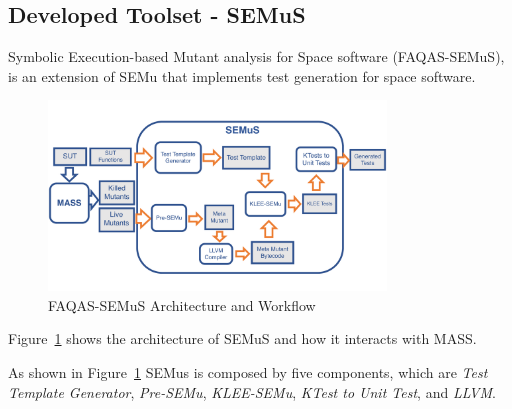 
\newpage
\subsection{Developed Toolset - SEMuS}
\label{sec:semus}

\STARTCHANGEDWPT

Symbolic Execution-based Mutant analysis for Space software (FAQAS-SEMuS), is an extension of SEMu that implements test generation for space software. 


\begin{figure}[tb]
\begin{center}
\includegraphics[width=0.8\textwidth]{images/semus-architecture}
\caption{FAQAS-SEMuS Architecture and Workflow}
\label{fig:semus_architecture}
\end{center}
\end{figure}

Figure~\ref{fig:semus_architecture} shows the architecture of SEMuS and how it interacts with MASS.


As shown in Figure~\ref{fig:semus_architecture} SEMus is composed by five components, which are \emph{Test Template Generator},  \emph{Pre-SEMu},  \emph{KLEE-SEMu},  \emph{KTest to Unit Test}, and \emph{LLVM}.



